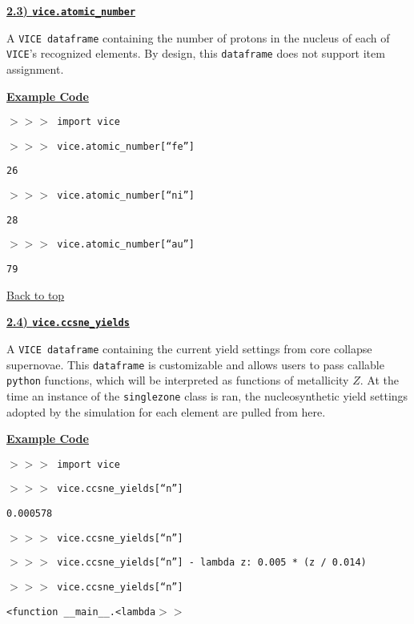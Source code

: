 \documentclass{report}
\begin{document}
\newpage
\noindent 
\begin{center}
\hypertarget{df:atomic_number}{
	\underline{\LARGE
		\textbf{2.3) \texttt{vice.atomic\_number}} 
	}
}
\end{center}
\par\noindent 
A \texttt{VICE dataframe} containing the number of protons in the nucleus of 
each of \texttt{VICE}'s recognized elements. By design, this \texttt{dataframe} 
does not support item assignment. 
\par\null\par\noindent 
\underline{\textbf{Example Code}} 
\par\noindent 
\texttt{$>>>$ import vice} \par\noindent 
\texttt{$>>>$ vice.atomic\_number[``fe'']} \par\noindent 
\texttt{26} \par\noindent 
\texttt{$>>>$ vice.atomic\_number[``ni'']} \par\noindent 
\texttt{28} \par\noindent 
\texttt{$>>>$ vice.atomic\_number[``au'']} \par\noindent 
\texttt{79} \par\noindent 

\vfill
\hyperlink{top}{Back to top}
\clearpage 

\newpage
\noindent 
\begin{center}
\hypertarget{df:ccsne_yields}{
	\underline{\LARGE
		\textbf{2.4) \texttt{vice.ccsne\_yields}}
	}
}
\end{center}
A \texttt{VICE dataframe} containing the current yield settings from core 
collapse supernovae. This \texttt{dataframe} is customizable and allows users 
to pass callable \texttt{python} functions, which will be interpreted as 
functions of metallicity $Z$. At the time an instance of the 
\texttt{singlezone} class is ran, the nucleosynthetic yield settings adopted 
by the simulation for each element are pulled from here. 
\par\null\par\noindent 
\underline{\textbf{Example Code}} 
\par\noindent 
\texttt{$>>>$ import vice} \par\noindent 
\texttt{$>>>$ vice.ccsne\_yields[``n'']} \par\noindent 
\texttt{0.000578} \par\noindent 
\texttt{$>>>$ vice.ccsne\_yields[``n'']} \par\noindent 
\texttt{$>>>$ vice.ccsne\_yields[``n''] - lambda z: 0.005 * (z / 0.014)} 
\par\noindent 
\texttt{$>>>$ vice.ccsne\_yields[``n'']} \par\noindent 
\texttt{<function \_\_main\_\_.<lambda$>>$} \par\noindent 
\end{document}
